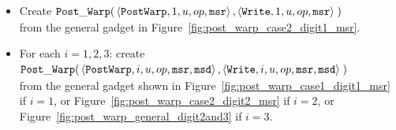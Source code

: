 \begin{itemize}
\begin{itemize}
            \item Create
            $\begin{aligned}[t]
                \postwarp(& \left \langle {\tt PostWarp}, 1, u, \inc, {\tt msr} \right\rangle,    %
                            \left \langle {\tt Write},    1, u, \inc, {\tt msr} \right\rangle \;) %
            \end{aligned}$ \\
            from the general gadget in Figure~\ref{fig:post_warp_case2_digit1_msr}.
            \vspace{.5cm}

            \item For each $i=1,2,3$: create\\
            $\begin{aligned}[t]
                \postwarp(& \left \langle {\tt PostWarp}, i, u, \inc, {\tt msr}, {\tt msd} \right\rangle,    %
                            \left \langle {\tt Write},    i, u, \inc, {\tt msr}, {\tt msd} \right\rangle \;) %
            \end{aligned}$ \\
            from the general gadget shown in Figure~\ref{fig:post_warp_case1_digit1_msr} if $i = 1$, or
            Figure~\ref{fig:post_warp_case2_digit2_msr} if $i = 2$, or Figure~\ref{fig:post_warp_general_digit2and3} if $i = 3$.
            \vspace{.5cm}

        \end{itemize}



\end{itemize}
